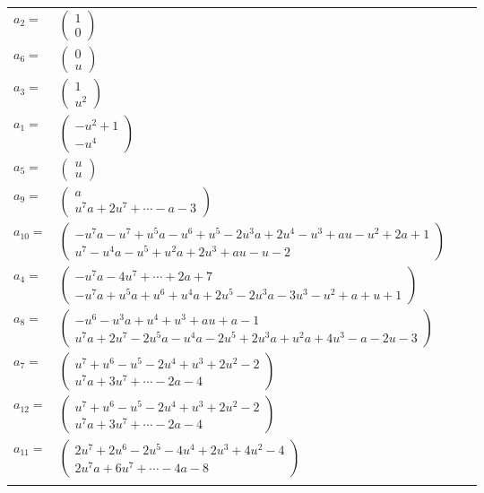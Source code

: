 \documentclass[1p]{elsarticle_modified}
\theoremstyle{definition}
\begin{document}
\begin{tabular}{m{7pt} m{180pt} m{7pt} m{180pt} }
\flushright $a_{2}=$&$\begin{pmatrix}1\\0\end{pmatrix}$ \\
\flushright $a_{6}=$&$\begin{pmatrix}0\\u\end{pmatrix}$ \\
\flushright $a_{3}=$&$\begin{pmatrix}1\\u^2\end{pmatrix}$ \\
\flushright $a_{1}=$&$\begin{pmatrix}- u^2+1\\- u^4\end{pmatrix}$ \\
\flushright $a_{5}=$&$\begin{pmatrix}u\\u\end{pmatrix}$ \\
\flushright $a_{9}=$&$\begin{pmatrix}a\\u^7 a+2 u^7+\cdots- a-3\end{pmatrix}$ \\
\flushright $a_{10}=$&$\begin{pmatrix}- u^7 a- u^7+u^5 a- u^6+u^5-2 u^3 a+2 u^4- u^3+a u- u^2+2 a+1\\u^7- u^4 a- u^5+u^2 a+2 u^3+a u- u-2\end{pmatrix}$ \\
\flushright $a_{4}=$&$\begin{pmatrix}- u^7 a-4 u^7+\cdots+2 a+7\\- u^7 a+u^5 a+u^6+u^4 a+2 u^5-2 u^3 a-3 u^3- u^2+a+u+1\end{pmatrix}$ \\
\flushright $a_{8}=$&$\begin{pmatrix}- u^6- u^3 a+u^4+u^3+a u+a-1\\u^7 a+2 u^7-2 u^5 a- u^4 a-2 u^5+2 u^3 a+u^2 a+4 u^3- a-2 u-3\end{pmatrix}$ \\
\flushright $a_{7}=$&$\begin{pmatrix}u^7+u^6- u^5-2 u^4+u^3+2 u^2-2\\u^7 a+3 u^7+\cdots-2 a-4\end{pmatrix}$ \\
\flushright $a_{12}=$&$\begin{pmatrix}u^7+u^6- u^5-2 u^4+u^3+2 u^2-2\\u^7 a+3 u^7+\cdots-2 a-4\end{pmatrix}$ \\
\flushright $a_{11}=$&$\begin{pmatrix}2 u^7+2 u^6-2 u^5-4 u^4+2 u^3+4 u^2-4\\2 u^7 a+6 u^7+\cdots-4 a-8\end{pmatrix}$\\&\end{tabular}
\end{document}
